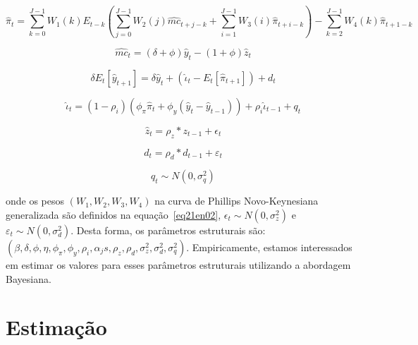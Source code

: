 \documentclass[twoside,a4paper,11pt]{report}
\begin{document}
\begin{equation}\label{eq23en02}
{\hat{\pi}}_{t}=\sum_{k=0}^{J-1}{{W}_{1}(k)}{E}_{t-k}(\sum_{j=0}^{J-1}{{W}_{2}(j){\hat{mc}}_{t+j-k}+\sum_{i=1}^{J-1}{{W}_{3}(i){\hat{\pi}}_{t+i-k}}})-\sum_{k=2}^{J-1}{{W}_{4}(k){\hat{\pi}}_{t+1-k}} 
\end{equation}

\begin{equation}\label{eq24en02}
{\hat{mc}}_{t}=(\delta +\phi){\hat{y}}_{t}-(1+\phi){\hat{z}}_{t}
\end{equation}

\begin{equation}\label{eq25en02}
\delta{E}_{t}[{\hat{y}}_{t+1}]=\delta{\hat{y}}_{t}+({\hat{\iota}}_{t}-{E}_{t}[{\hat{\pi}}_{t+1}])+{d}_{t}
\end{equation}

\begin{equation}\label{eq26en02}
{\hat{\iota}}_{t}=(1-{\rho}_{i})({\phi}_{\pi}{\hat{\pi}}_{t}+{\phi}_{y}({\hat{y}}_{t}-{\hat{y}}_{t-1}))+{\rho}_{i}{\hat{\iota}}_{t-1}+{q}_{t}
\end{equation}

\begin{equation}\label{eq27en02}
{\hat{z}}_{t}={\rho}_{z}\ast {z}_{t-1}+{\epsilon}_{t}
\end{equation}

\begin{equation}\label{eq28en02}
{d}_{t}={\rho}_{d}\ast {d}_{t-1}+{\varepsilon}_{t}
\end{equation}

\begin{equation}\label{eq29en02}
{q}_{t}\sim N\left(0,{\sigma}_{q}^{2}\right) 
\end{equation}

\noindent onde os pesos $(W_{1},W_{2},W_{3},W_{4})$ na curva de Phillips Novo-Keynesiana generalizada são definidos na equação~\ref{eq21en02}, ${\epsilon}_{t}\sim N\left( 0,{\sigma}_{z}^{2}\right)$ e ${\varepsilon}_{t}\sim N\left( 0,{\sigma}_{d}^{2}\right)$. Desta forma, os parâmetros estruturais são: $(\beta,\delta,\phi,\eta,\phi_{\pi},\phi_{y},\rho_{i},\alpha_{j}s,\rho_{z},\rho_{d},{\sigma}_{z}^{2},{\sigma}_{d}^{2},{\sigma}_{q}^{2})$. Empiricamente, estamos interessados em estimar os valores para esses parâmetros estruturais utilizando a abordagem Bayesiana.

\section*{Estimação}
\end{document}
